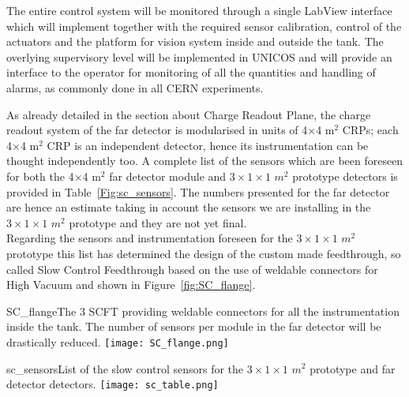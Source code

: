  The entire control system will be monitored through a single LabView  interface which will implement together with the required sensor
 calibration, control of the actuators and the platform for vision  system inside and outside the tank. The overlying supervisory level
 will be implemented in UNICOS and will provide an interface to the  operator for monitoring of all the quantities and handling of alarms,
 as commonly done in all CERN experiments.  

As already detailed in the section about Charge Readout Plane, the charge readout system of the far detector is modularised in units of 4$\times$4 m$^2$ CRPs; each 4$\times$4 m$^2$ CRP is an independent detector, hence its instrumentation can be thought independently too. A complete list of the sensors which are been foreseen for both the 4$\times$4 m$^2$ far detector module and $3 \times 1 \times 1$ $m^2$ prototype detectors is provided in Table~\ref{Fig:sc_sensors}.  The numbers presented for the far detector are hence an estimate taking in account the sensors we are installing in the $3 \times 1 \times 1$ $m^2$ prototype and they are not yet final.
\\ Regarding the sensors and instrumentation foreseen for the $3 \times 1 \times 1$ $m^2$ prototype this list has determined the design of the custom made feedthrough, so called Slow Control Feedthrough based on the use of weldable connectors for High Vacuum and shown in Figure~\ref{fig:SC_flange}.

\begin{cdrfigure}{SC_flange}{The 3 SCFT providing weldable connectors for all the instrumentation inside the tank. The number of sensors per module in the far detector will be drastically reduced.}
   \texttt{[image: SC\_flange.png]}
 \end{cdrfigure}

\begin{cdrfigure}{sc_sensors}{List of the slow control sensors for the $3 \times 1 \times 1$ $m^2$ prototype and far detector detectors.}
 \texttt{[image: sc\_table.png]}
 \end{cdrfigure}
   